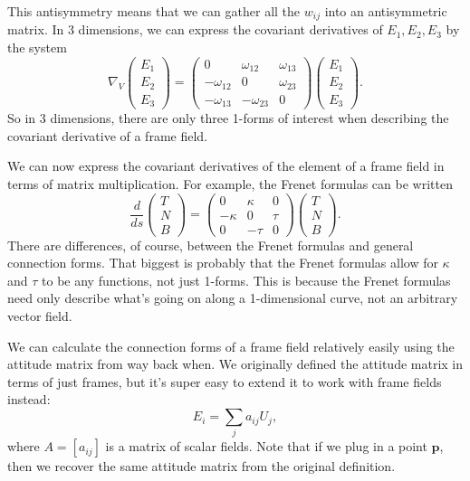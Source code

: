 \documentclass[twoside,10pt]{report}
\begin{document}
This antisymmetry means that we can gather all the $w_{ij}$ into an antisymmetric matrix. In 3 dimensions, we can express the covariant derivatives of $E_1,E_2,E_3$ by the system
\[
	\nabla_{V}
	\begin{pmatrix}
		E_1\\E_2\\E_3
	\end{pmatrix}=
\begin{pmatrix}
	0 & \omega_{12}& \omega_{13} \\
	-\omega_{12}&0&\omega_{23}\\
	-\omega_{13}&-\omega_{23}&0
\end{pmatrix}
\begin{pmatrix}
	E_1\\E_2\\E_3
\end{pmatrix}.
\] 
So in 3 dimensions, there are only three 1-forms of interest when describing the covariant derivative of a frame field.

We can now express the covariant derivatives of the element of a frame field in terms of matrix multiplication. For example, the Frenet formulas can be written
\[
\frac{d }{d s} 
\begin{pmatrix}
	T \\ N \\ B
\end{pmatrix} = 
\begin{pmatrix}
	0 & \kappa & 0 \\
	-\kappa &0&\tau \\
	0&-\tau&0
\end{pmatrix}
\begin{pmatrix}
	T \\ N \\ B
\end{pmatrix}.
\] 
There are differences, of course, between the Frenet formulas and general connection forms. That biggest is probably that the Frenet formulas allow for $\kappa$ and $\tau$ to be any functions, not just 1-forms. This is because the Frenet formulas need only describe what's going on along a 1-dimensional curve, not an arbitrary vector field.

We can calculate the connection forms of a frame field relatively easily using the attitude matrix from way back when. We originally defined the attitude matrix in terms of just frames, but it's super easy to extend it to work with frame fields instead:
\[
E_i = \sum_j a_{ij}U_j,
\] where $A = [a_{ij}]$ is a matrix of scalar fields. Note that if we plug in a point $\mathbf{p}$, then we recover the same attitude matrix from the original definition.
\end{document}
